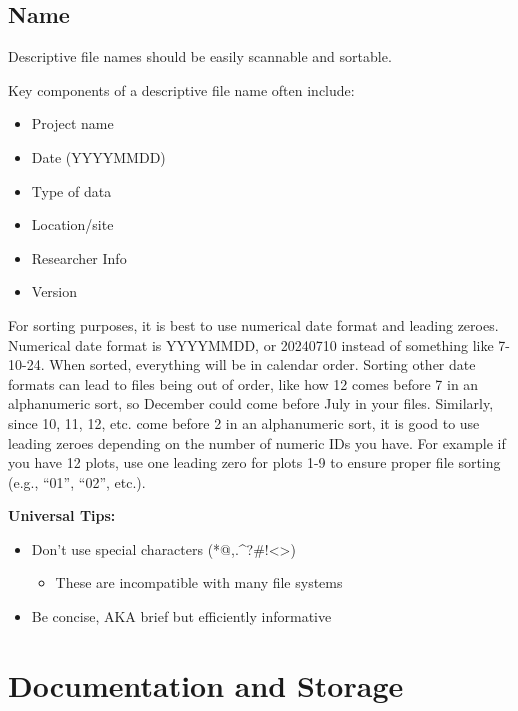 \documentclass[
  letterpaper,
  DIV=11,
  numbers=noendperiod]{scrreprt}
\providecommand{\tightlist}{%
  \setlength{\itemsep}{0pt}\setlength{\parskip}{0pt}}\usepackage{longtable,booktabs,array}
\begin{document}
\section{Name}\label{name}

Descriptive file names should be easily scannable and sortable.

Key components of a descriptive file name often include:

\begin{itemize}
\item
  Project name
\item
  Date (YYYYMMDD)
\item
  Type of data
\item
  Location/site
\item
  Researcher Info
\item
  Version
\end{itemize}

For sorting purposes, it is best to use numerical date format and
leading zeroes. Numerical date format is YYYYMMDD, or 20240710 instead
of something like 7-10-24. When sorted, everything will be in calendar
order. Sorting other date formats can lead to files being out of order,
like how 12 comes before 7 in an alphanumeric sort, so December could
come before July in your files. Similarly, since 10, 11, 12, etc. come
before 2 in an alphanumeric sort, it is good to use leading zeroes
depending on the number of numeric IDs you have. For example if you have
12 plots, use one leading zero for plots 1-9 to ensure proper file
sorting (e.g., ``01'', ``02'', etc.).

\textbf{Universal Tips:}

\begin{itemize}
\item
  Don't use special characters (*@,.\^{}?\#!\textless\textgreater)

  \begin{itemize}
  \tightlist
  \item
    These are incompatible with many file systems
  \end{itemize}
\item
  Be concise, AKA brief but efficiently informative
\end{itemize}

\chapter{Documentation and Storage}\label{documentation-and-storage}
\end{document}
